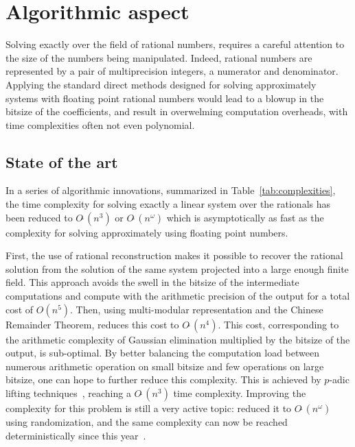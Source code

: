 \newcommand{\GO}[1]{\ensuremath{O(#1)}\xspace}
\newcommand{\SO}[1]{\ensuremath{O\tilde\ (#1)}\xspace}
\newcommand{\vect}[1]{\ensuremath{\mathbf{#1}}\xspace}
\newcommand{\mat}[1]{\ensuremath{\mathbf{#1}}\xspace}
\section{Algorithmic aspect}

Solving exactly over the field of rational numbers, requires a careful attention to the size of the numbers being
manipulated. Indeed, rational numbers are represented by a pair of multiprecision integers, a numerator and
denominator. Applying the standard direct methods designed for solving approximately systems with floating point
rational numbers would lead to a blowup in the bitsize of the coefficients, and result in overwelming computation
overheads, with time complexities often not even polynomial.

\subsection{State of the art}

In a series of algorithmic innovations, summarized in Table~\ref{tab:complexities}, the time complexity for solving exactly a linear system over the rationals has
been reduced to $\SO{n^3}$ or $\SO{n^\omega}$ which is asymptotically as fast as the complexity for solving
approximately using floating point numbers.

First, the use of rational reconstruction makes it possible to recover the rational solution from the solution of the same
system projected into a large enough finite field.
This approach avoids the  swell in the bitsize of the intermediate computations and compute with the arithmetic precision of the output for a total cost of $\GO{n^5}$.
Then, using  multi-modular representation and the Chinese Remainder Theorem, reduces this cost  to $\SO{n^4}$.
This cost, corresponding to the arithmetic complexity of Gaussian elimination multiplied by the bitsize of the output,
is sub-optimal. By better balancing the computation load between numerous arithmetic operation on small bitsize and
few operations on large bitsize, one can hope to further reduce this complexity. This is achieved by $p$-adic lifting
techniques~\cite{Dix82}, reaching a $\SO{n^3}$ time complexity. Improving the complexity for this problem is still a
very active topic: \cite{Sto05} reduced it to $\SO{n^\omega}$ using randomization, and the same
complexity can now be reached deterministically since this year~\cite{BLS19}.



